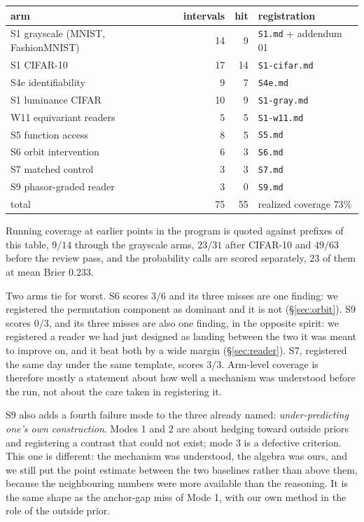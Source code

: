 \begin{center}\small
\begin{tabular}{@{}lrrl@{}}
\toprule
arm & intervals & hit & registration \\
\midrule
S1 grayscale (MNIST, FashionMNIST) & 14 & 9 & \texttt{S1.md} + addendum 01 \\
S1 CIFAR-10                        & 17 & 14 & \texttt{S1-cifar.md} \\
S4e identifiability                & 9  & 7  & \texttt{S4e.md} \\
S1 luminance CIFAR                 & 10 & 9  & \texttt{S1-gray.md} \\
W11 equivariant readers            & 5  & 5  & \texttt{S1-w11.md} \\
S5 function access                 & 8  & 5  & \texttt{S5.md} \\
S6 orbit intervention              & 6  & 3  & \texttt{S6.md} \\
S7 matched control                 & 3  & 3  & \texttt{S7.md} \\
S9 phasor-graded reader            & 3  & 0  & \texttt{S9.md} \\
\midrule
total                              & 75 & 55 & realized coverage $73\%$ \\
\bottomrule
\end{tabular}
\end{center}

Running coverage at earlier points in the program is quoted against prefixes of this table, $9/14$ through the grayscale arms, $23/31$ after CIFAR-10 and $49/63$ before the review pass, and the probability calls are scored separately, $23$ of them at mean Brier $0.233$.

Two arms tie for worst. S6 scores $3/6$ and its three misses are one finding: we registered the
permutation component as dominant and it is not (\S\ref{sec:orbit}). S9 scores $0/3$, and its three
misses are also one finding, in the opposite spirit: we registered a reader we had just designed
as landing between the two it was meant to improve on, and it beat both by a wide margin
(\S\ref{sec:reader}). S7, registered the same day under the same template, scores $3/3$. Arm-level
coverage is therefore mostly a statement about how well a mechanism was understood before the run,
not about the care taken in registering it.

S9 also adds a fourth failure mode to the three already named: \emph{under-predicting one's own
construction}. Modes 1 and 2 are about hedging toward outside priors and registering a contrast that
could not exist; mode 3 is a defective criterion. This one is different: the mechanism was understood, the algebra was ours, and we still put the point estimate between the two baselines
rather than above them, because the neighbouring numbers were more available than the reasoning. It
is the same shape as the anchor-gap miss of Mode 1, with our own method in the role of the outside
prior.



